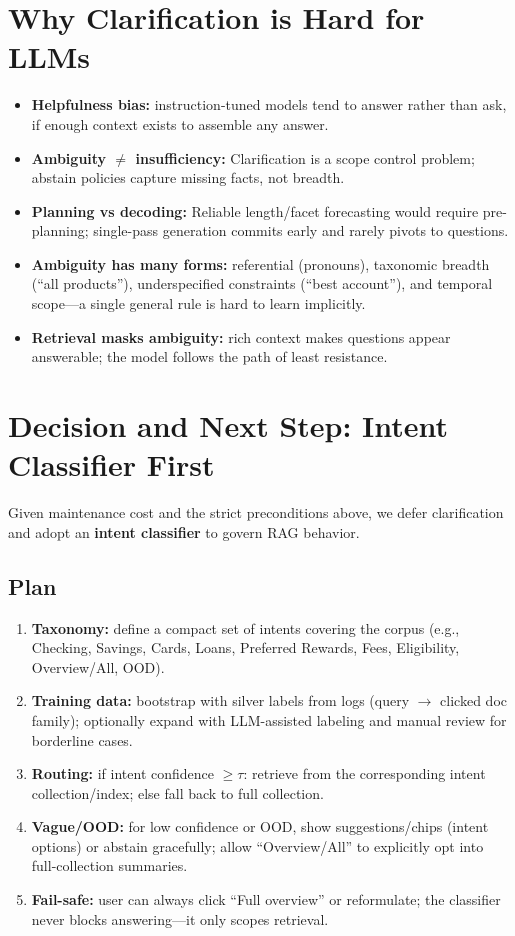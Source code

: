 \documentclass[11pt]{article}
\begin{document}
\section{Why Clarification is Hard for LLMs}
\begin{itemize}[leftmargin=1.25em]
  \item \textbf{Helpfulness bias:} instruction-tuned models tend to answer rather than ask, if enough context exists to assemble any answer.
  \item \textbf{Ambiguity $\neq$ insufficiency:} Clarification is a scope control problem; abstain policies capture missing facts, not breadth.
  \item \textbf{Planning vs decoding:} Reliable length/facet forecasting would require pre-planning; single-pass generation commits early and rarely pivots to questions.
  \item \textbf{Ambiguity has many forms:} referential (pronouns), taxonomic breadth (``all products''), underspecified constraints (``best account''), and temporal scope---a single general rule is hard to learn implicitly.
  \item \textbf{Retrieval masks ambiguity:} rich context makes questions appear answerable; the model follows the path of least resistance.
\end{itemize}

\section{Decision and Next Step: Intent Classifier First}
Given maintenance cost and the strict preconditions above, we defer clarification and adopt an \textbf{intent classifier} to govern RAG behavior.

\subsection{Plan}
\begin{enumerate}[leftmargin=1.25em]
  \item \textbf{Taxonomy:} define a compact set of intents covering the corpus (e.g., Checking, Savings, Cards, Loans, Preferred Rewards, Fees, Eligibility, Overview/All, OOD).
  \item \textbf{Training data:} bootstrap with silver labels from logs (query $\rightarrow$ clicked doc family); optionally expand with LLM-assisted labeling and manual review for borderline cases.
  \item \textbf{Routing:} if intent confidence $\ge \tau$: retrieve from the corresponding intent collection/index; else fall back to full collection.
  \item \textbf{Vague/OOD:} for low confidence or OOD, show suggestions/chips (intent options) or abstain gracefully; allow ``Overview/All'' to explicitly opt into full-collection summaries.
  \item \textbf{Fail-safe:} user can always click ``Full overview'' or reformulate; the classifier never blocks answering---it only scopes retrieval.
\end{enumerate}
\end{document}

